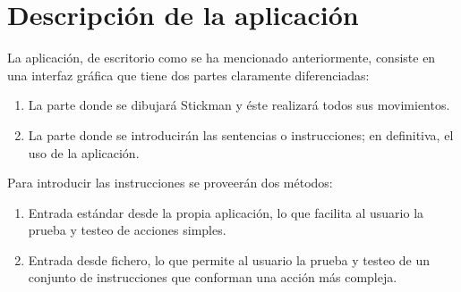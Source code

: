    \section{Descripción de la aplicación}
   La aplicación, de escritorio como se ha mencionado anteriormente, consiste en una interfaz gráfica que tiene dos partes claramente diferenciadas: 
   \begin{enumerate}
      \item La parte donde se dibujará Stickman y éste realizará todos sus movimientos. 
      \item La parte donde se introducirán las sentencias o instrucciones; en definitiva, el uso de la aplicación.\\
   \end{enumerate}

   Para introducir las instrucciones se proveerán dos métodos: 
   \begin{enumerate}
      \item Entrada estándar desde la propia aplicación, lo que facilita al usuario la prueba y testeo de acciones simples. 
      \item Entrada desde fichero, lo que permite al usuario la prueba y testeo de un conjunto de instrucciones que conforman una acción más compleja.\\
   \end{enumerate}















